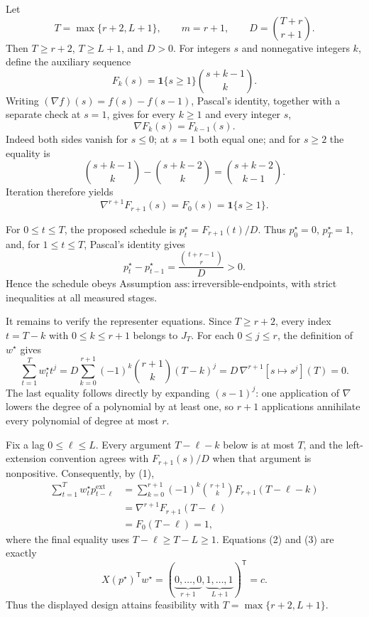 Let
\[
 T=\max\{r+2,L+1\},\qquad m=r+1,
 \qquad D=\binom{T+r}{r+1}.
\]
Then \(T\ge r+2\), \(T\ge L+1\), and \(D>0\).  For integers \(s\) and nonnegative integers \(k\), define the auxiliary sequence
\[
 F_k(s)=\mathbf 1\{s\ge1\}\binom{s+k-1}{k}.
\]
Writing \((\nabla f)(s)=f(s)-f(s-1)\), Pascal's identity, together with a separate check at \(s=1\), gives for every \(k\ge1\) and every integer \(s\),
\[
 \nabla F_k(s)=F_{k-1}(s).
\]
Indeed both sides vanish for \(s\le0\); at \(s=1\) both equal one; and for \(s\ge2\) the equality is
\[
 \binom{s+k-1}{k}-\binom{s+k-2}{k}
 =\binom{s+k-2}{k-1}.
\]
Iteration therefore yields
\[
 \nabla^{r+1}F_{r+1}(s)=F_0(s)=\mathbf 1\{s\ge1\}.
 \tag{1}
\]

For \(0\le t\le T\), the proposed schedule is \(p_t^\star=F_{r+1}(t)/D\).  Thus \(p_0^\star=0\), \(p_T^\star=1\), and, for \(1\le t\le T\), Pascal's identity gives
\[
 p_t^\star-p_{t-1}^\star
 =\frac{\binom{t+r-1}{r}}{D}>0.
\]
Hence the schedule obeys Assumption \(\mathrm{ass:irreversible\text{-}endpoints}\), with strict inequalities at all measured stages.

It remains to verify the representer equations.  Since \(T\ge r+2\), every index \(t=T-k\) with \(0\le k\le r+1\) belongs to \(J_T\).  For each \(0\le j\le r\), the definition of \(w^\star\) gives
\[
 \sum_{t=1}^{T}w_t^\star t^j
 =D\sum_{k=0}^{r+1}(-1)^k\binom{r+1}{k}(T-k)^j
 =D\,\nabla^{r+1}[s\mapsto s^j](T)
 =0. \tag{2}
\]
The last equality follows directly by expanding \((s-1)^j\): one application of \(\nabla\) lowers the degree of a polynomial by at least one, so \(r+1\) applications annihilate every polynomial of degree at most \(r\).

Fix a lag \(0\le\ell\le L\).  Every argument \(T-\ell-k\) below is at most \(T\), and the left-extension convention agrees with \(F_{r+1}(s)/D\) when that argument is nonpositive.  Consequently, by (1),
\[
\begin{aligned}
 \sum_{t=1}^{T}w_t^\star p_{t-\ell}^{\mathrm{ext}}
 &=\sum_{k=0}^{r+1}(-1)^k\binom{r+1}{k}F_{r+1}(T-\ell-k)\\
 &=\nabla^{r+1}F_{r+1}(T-\ell)\\
 &=F_0(T-\ell)=1,
\end{aligned} \tag{3}
\]
where the final equality uses \(T-\ell\ge T-L\ge1\).  Equations (2) and (3) are exactly
\[
 X(p^\star)^{\mathsf T}w^\star
 =(\underbrace{0,\ldots,0}_{r+1},
   \underbrace{1,\ldots,1}_{L+1})^{\mathsf T}=c.
\]
Thus the displayed design attains feasibility with \(T=\max\{r+2,L+1\}\).

